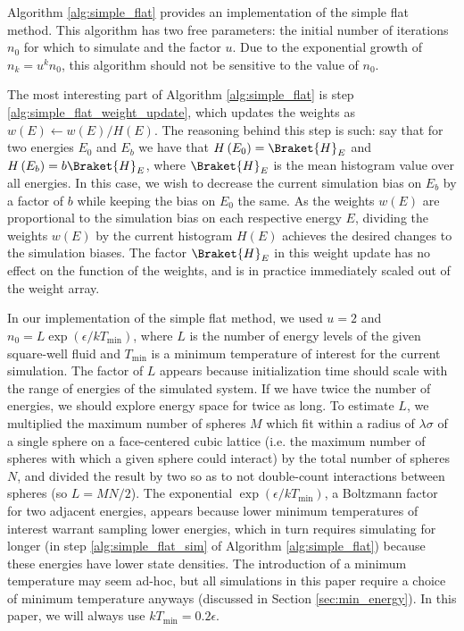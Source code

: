 \documentclass[11pt]{article}
\newcommand{\bk}{\Braket} %
\renewcommand{\t}{\text} %
\newcommand{\p}[1]{\left(#1\right)} %
\begin{document}
Algorithm \ref{alg:simple_flat} provides an implementation of the
simple flat method. This algorithm has two free parameters: the
initial number of iterations $n_0$ for which to simulate and the
factor $u$. Due to the exponential growth of $n_k=u^kn_0$, this
algorithm should not be sensitive to the value of $n_0$.

The most interesting part of Algorithm \ref{alg:simple_flat} is step
\ref{alg:simple_flat_weight_update}, which updates the weights as
$w\p{E}\leftarrow w\p{E}/H\p{E}$. The reasoning behind this step is
such: say that for two energies $E_0$ and $E_b$ we have that
$H\p{E_0}=\bk{H}_E$ and $H\p{E_b}=b\bk{H}_E$, where $\bk{H}_E$ is the
mean histogram value over all energies. In this case, we wish to
decrease the current simulation bias on $E_b$ by a factor of $b$ while
keeping the bias on $E_0$ the same. As the weights $w\p{E}$ are
proportional to the simulation bias on each respective energy $E$,
dividing the weights $w\p{E}$ by the current histogram $H\p{E}$
achieves the desired changes to the simulation biases. The factor
$\bk{H}_E$ in this weight update has no effect on the function of the
weights, and is in practice immediately scaled out of the weight
array.

In our implementation of the simple flat method, we used $u=2$ and
$n_0=L\exp\p{\epsilon/kT_{\t{min}}}$, where $L$ is the number of
energy levels of the given square-well fluid and $T_{\t{min}}$ is a
minimum temperature of interest for the current simulation. The factor
of $L$ appears because initialization time should scale with the range
of energies of the simulated system. If we have twice the number of
energies, we should explore energy space for twice as long. To
estimate $L$, we multiplied the maximum number of spheres $M$ which
fit within a radius of $\lambda\sigma$ of a single sphere on a
face-centered cubic lattice (i.e. the maximum number of spheres with
which a given sphere could interact) by the total number of spheres
$N$, and divided the result by two so as to not double-count
interactions between spheres (so $L=MN/2$). The exponential
$\exp\p{\epsilon/kT_{\t{min}}}$, a Boltzmann factor for two adjacent
energies, appears because lower minimum temperatures of interest
warrant sampling lower energies, which in turn requires simulating for
longer (in step \ref{alg:simple_flat_sim} of Algorithm
\ref{alg:simple_flat}) because these energies have lower state
densities. The introduction of a minimum temperature may seem ad-hoc,
but all simulations in this paper require a choice of minimum
temperature anyways (discussed in Section \ref{sec:min_energy}). In
this paper, we will always use $kT_{\t{min}}=0.2\epsilon$.
\end{document}
